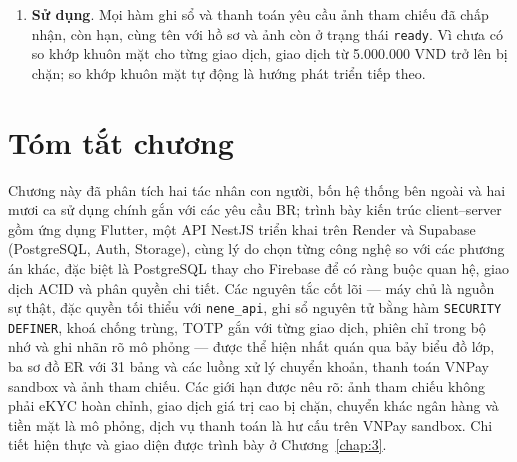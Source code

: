 \begin{enumerate}
  \item \textbf{Sử dụng}. Mọi hàm ghi sổ và thanh toán yêu cầu ảnh tham chiếu đã chấp nhận, còn hạn, cùng tên với hồ sơ và ảnh còn ở trạng thái \texttt{ready}. Vì chưa có so khớp khuôn mặt cho từng giao dịch, giao dịch từ 5.000.000 VND trở lên bị chặn; so khớp khuôn mặt tự động là hướng phát triển tiếp theo.
\end{enumerate}

\section{Tóm tắt chương}
\label{sec:ch2-summary}

Chương này đã phân tích hai tác nhân con người, bốn hệ thống bên ngoài và hai mươi ca sử dụng chính gắn với các yêu cầu BR; trình bày kiến trúc client--server gồm ứng dụng Flutter, một API NestJS triển khai trên Render và Supabase (PostgreSQL, Auth, Storage), cùng lý do chọn từng công nghệ so với các phương án khác, đặc biệt là PostgreSQL thay cho Firebase để có ràng buộc quan hệ, giao dịch ACID và phân quyền chi tiết. Các nguyên tắc cốt lõi --- máy chủ là nguồn sự thật, đặc quyền tối thiểu với \texttt{nene\_\allowbreak{}api}, ghi sổ nguyên tử bằng hàm \texttt{SECURITY DEFINER}, khoá chống trùng, TOTP gắn với từng giao dịch, phiên chỉ trong bộ nhớ và ghi nhãn rõ mô phỏng --- được thể hiện nhất quán qua bảy biểu đồ lớp, ba sơ đồ ER với 31 bảng và các luồng xử lý chuyển khoản, thanh toán VNPay sandbox và ảnh tham chiếu. Các giới hạn được nêu rõ: ảnh tham chiếu không phải eKYC hoàn chỉnh, giao dịch giá trị cao bị chặn, chuyển khác ngân hàng và tiền mặt là mô phỏng, dịch vụ thanh toán là hư cấu trên VNPay sandbox. Chi tiết hiện thực và giao diện được trình bày ở Chương~\ref{chap:3}.

